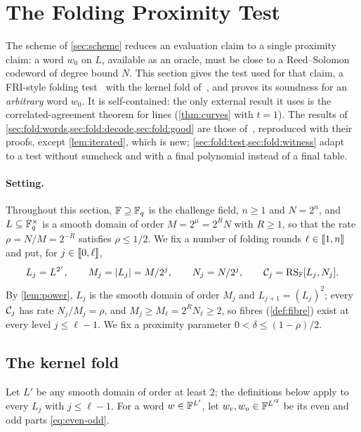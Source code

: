 \section{The Folding Proximity Test}\label{sec:fold}

The scheme of \cref{sec:scheme} reduces an evaluation claim to a single proximity claim: a word $w_0$ on $L$, available as an oracle, must be close to a Reed--Solomon codeword of degree bound $N$.
This section gives the test used for that claim, a FRI-style folding test~\cite{BBHR18} with the kernel fold of~\cite{Mkh26}, and proves its soundness for an \emph{arbitrary} word $w_0$.
It is self-contained: the only external result it uses is the correlated-agreement theorem for lines (\cref{thm:curves} with $t = 1$).
The results of \cref{sec:fold:words,sec:fold:decode,sec:fold:good} are those of~\cite[\S5.2 and \S7.1--7.3]{Mkh26}, reproduced with their proofs, except \cref{lem:iterated}, which is new; \cref{sec:fold:test,sec:fold:witness} adapt~\cite[\S7.4 and \S7.6]{Mkh26} to a test without sumcheck and with a final polynomial instead of a final table.

\paragraph{Setting.}
Throughout this section, $\mathbb{F} \supseteq \mathbb{F}_q$ is the challenge field, $n \ge 1$ and $N = 2^n$, and $L \subseteq \mathbb{F}_q^\times$ is a smooth domain of order $M = 2^{\mu} = 2^R N$ with $R \ge 1$, so that the rate $\rho = N/M = 2^{-R}$ satisfies $\rho \le 1/2$.
We fix a number of folding rounds $\ell \in \llbracket 1, n \rrbracket$ and put, for $j \in \llbracket 0, \ell \rrbracket$,
\[
  L_j = L^{2^j}, \qquad M_j = |L_j| = M/2^j, \qquad N_j = N/2^j, \qquad \mathcal{C}_j = \mathrm{RS}_{\mathbb{F}}[L_j, N_j].
\]
By \cref{lem:power}, $L_j$ is the smooth domain of order $M_j$ and $L_{j+1} = (L_j)^2$; every $\mathcal{C}_j$ has rate $N_j/M_j = \rho$, and $M_j \ge M_\ell = 2^R N_\ell \ge 2$, so fibres (\cref{def:fibre}) exist at every level $j \le \ell - 1$.
We fix a proximity parameter $0 < \delta \le (1-\rho)/2$.

\subsection{The kernel fold}\label{sec:fold:words}

Let $L'$ be any smooth domain of order at least $2$; the definitions below apply to every $L_j$ with $j \le \ell-1$.
For a word $w \in \mathbb{F}^{L'}$, let $w_e, w_o \in \mathbb{F}^{L'^2}$ be its even and odd parts \eqref{eq:even-odd}.

